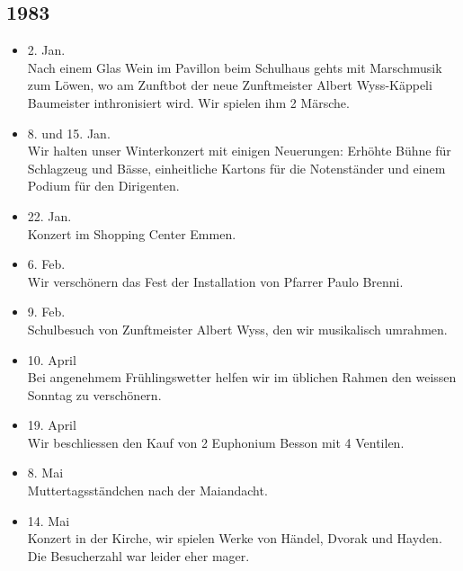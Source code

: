 \subsection*{1983}

\begin{history}


    \begin{itemize}

        \item 2. Jan.\\
              Nach einem Glas Wein im Pavillon beim Schulhaus gehts mit Marschmusik
              zum Löwen, wo am Zunftbot der neue Zunftmeister Albert Wyss-Käppeli
              Baumeister inthronisiert wird. Wir spielen ihm 2 Märsche.

        \item 8. und 15. Jan.\\
              Wir halten unser Winterkonzert mit einigen Neuerungen: Erhöhte Bühne für
              Schlagzeug und Bässe, einheitliche Kartons für die Notenständer und
              einem Podium für den Dirigenten.

        \item 22. Jan.\\
              Konzert im Shopping Center Emmen.

        \item 6. Feb.\\
              Wir verschönern das Fest der Installation von Pfarrer Paulo Brenni.

        \item 9. Feb.\\
              Schulbesuch von Zunftmeister Albert Wyss, den wir musikalisch umrahmen.

        \item 10. April\\
              Bei angenehmem Frühlingswetter helfen wir im üblichen Rahmen den weissen
              Sonntag zu verschönern.

        \item 19. April\\
              Wir beschliessen den Kauf von 2 Euphonium Besson mit 4 Ventilen.

        \item 8. Mai\\
              Muttertagsständchen nach der Maiandacht.

        \item 14. Mai\\
              Konzert in der Kirche, wir spielen Werke von Händel, Dvorak und Hayden.
              Die Besucherzahl war leider eher mager.


\end{itemize}
\end{history}
